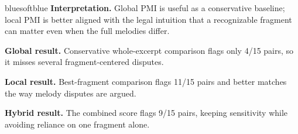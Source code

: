 \documentclass[portrait,a0,final]{a0poster}
\begin{document}
\begin{panelbox}[height=286mm]
\begin{minipage}[t]{0.615\linewidth}
\vspace{4mm}
\begin{callout}{blue}{softblue}
\textbf{Interpretation.}
Global PMI is useful as a conservative baseline; local PMI is better aligned with the legal intuition that a recognizable fragment can matter even when the full melodies differ.
\end{callout}
\end{minipage}
\par\vspace{6mm}
\begin{whitebox}[height=48mm]
\begin{minipage}[t]{0.31\linewidth}
{\bfseries\color{blue}Global result.}
Conservative whole-excerpt comparison flags only 4/15 pairs, so it misses several fragment-centered disputes.
\end{minipage}
\hfill
\begin{minipage}[t]{0.31\linewidth}
{\bfseries\color{green}Local result.}
Best-fragment comparison flags 11/15 pairs and better matches the way melody disputes are argued.
\end{minipage}
\hfill
\begin{minipage}[t]{0.31\linewidth}
{\bfseries\color{amber}Hybrid result.}
The combined score flags 9/15 pairs, keeping sensitivity while avoiding reliance on one fragment alone.
\end{minipage}
\end{whitebox}
\end{panelbox}

\vspace{9mm}
\end{document}
